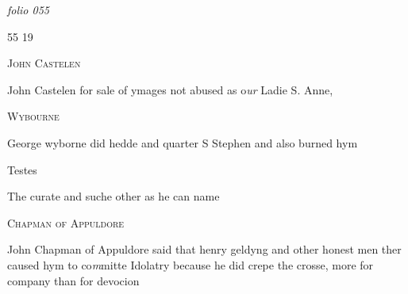 \documentclass[12pt, a4paper]{book}
\begin{document}
\textit{folio 055}


\begin{flushright}{\color{Mahogany}55} 19\end{flushright}
 

                  
				\begin{center}  {\scshape John Castelen}  \end{center}
			
	
		
				\marginpar[\vspace{0.5cm}{\textcolor{Gray}{Images}}]{}
			
		
		\ifthenelse{\isodd{\thepage}}
		{\reversemarginpar}
		{\normalmarginpar}
		John Castelen for sale of ymages not abused
  as o\textit{ur} Ladie S. Anne,
 

               
                  
				\begin{center}  {\scshape Wybourne}  \end{center}
			
               	
               		
				\marginpar[\vspace{0.5cm}{\textcolor{Gray}{Images}}]{}
			
               		
		\ifthenelse{\isodd{\thepage}}
		{\reversemarginpar}
		{\normalmarginpar}
		George wyborne did hedde and quarter S Stephen
 and also burned hym
               	
               		
               			Testes
               			
		\ifthenelse{\isodd{\thepage}}
		{\reversemarginpar}
		{\normalmarginpar}
		The curate and suche other as he can
 name
               	
 

               
                  
				\begin{center}  {\scshape Chapman of Appuldore}  \end{center}
			
               	
               		
				\marginpar[\vspace{0.5cm}{\textcolor{Gray}{ceremonies}}]{}
			
               		
		\ifthenelse{\isodd{\thepage}}
		{\reversemarginpar}
		{\normalmarginpar}
		John Chapman of Appuldore said that henry geldyng
  and other honest men ther caused hym to co\textit{m}mitte Idolatry
 because he did crepe the crosse, more for company
 than for devocion
               		
\end{document}

